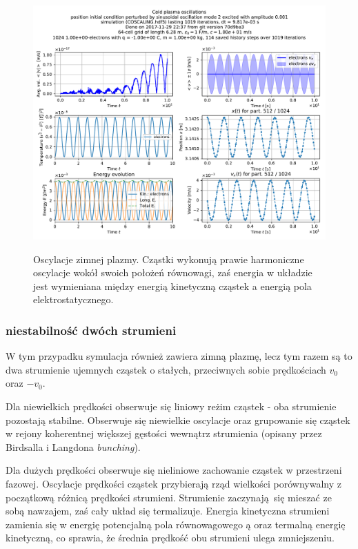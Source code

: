 \begin{figure}[h!]
  \includegraphics[width=\textwidth]{Images/COSCALING}
  \label{fig:coldplasma}
  \caption{Oscylacje zimnej plazmy. Cząstki wykonują prawie harmoniczne oscylacje wokół swoich położeń równowagi, zaś energia
    w układzie jest wymieniana między energią kinetyczną cząstek a energią pola elektrostatycznego.}
\end{figure}

    \subsubsection{niestabilność dwóch strumieni}
W tym przypadku symulacja również zawiera zimną plazmę, lecz tym razem są to dwa strumienie ujemnych cząstek
o stałych, przeciwnych sobie prędkościach $v_0$ oraz $-v_0$.

    Dla niewielkich prędkości  obserwuje się
    liniowy reżim cząstek - oba strumienie pozostają stabilne. Obserwuje się niewielkie oscylacje oraz
grupowanie się cząstek w rejony koherentnej większej gęstości wewnątrz strumienia (opisany przez Birdsalla i Langdona \emph{bunching}).

    Dla dużych prędkości  obserwuje się nieliniowe
    zachowanie cząstek w przestrzeni fazowej. Oscylacje prędkości cząstek przybierają rząd wielkości porównywalny
    z początkową różnicą prędkości strumieni.
 Strumienie zaczynają się mieszać ze sobą nawzajem, zaś cały układ się termalizuje. Energia kinetyczna
 strumieni zamienia się w energię potencjalną pola równowagowego ą %
oraz termalną energię kinetyczną, co sprawia, że średnia prędkość obu strumieni ulega zmniejszeniu. %

